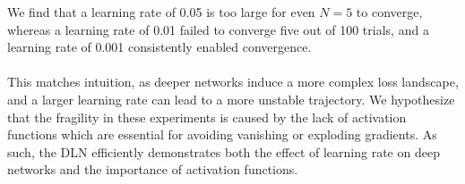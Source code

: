 \documentclass[11pt]{article}
\begin{document}
We find that a learning rate of 0.05 is too large for even $N = 5$ to converge, whereas a learning rate of 0.01 failed to converge five out of 100 trials, and a learning rate of 0.001 consistently enabled convergence.
\\\\
This matches intuition, as deeper networks induce a more complex loss landscape, and a larger learning rate can lead to a more unstable trajectory. We hypothesize that the fragility in these experiments is caused by the lack of activation functions which are essential for avoiding vanishing or exploding gradients. As such, the DLN efficiently demonstrates both the effect of learning rate on deep networks and the importance of activation functions.

\pagebreak



\end{document}
